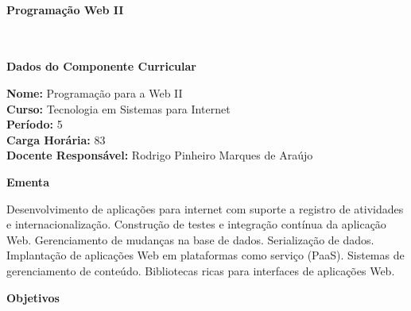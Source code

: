 \paragraph{Programação Web II} \


\begin{snugshade}\begin{center}\textbf{
    Dados do Componente Curricular
}\end{center}\end{snugshade}

\noindent \textbf{Nome:}                Programação para a Web II
\\        \textbf{Curso:}               Tecnologia em Sistemas para Internet
\\        \textbf{Período:}             \unit{5}{\degree}
\\        \textbf{Carga Horária:}       \unit{83}{\hour}
\\        \textbf{Docente Responsável:} Rodrigo Pinheiro Marques de Araújo


\begin{snugshade}\begin{center}\textbf{
    Ementa
\vphantom{q}}\end{center}\end{snugshade}

\noindent
Desenvolvimento de aplicações para internet com suporte a registro de atividades e internacionalização. Construção de testes e integração contínua da aplicação Web. Gerenciamento de mudanças na base de dados. Serialização de dados. Implantação de aplicações Web em plataformas como serviço (PaaS). Sistemas de gerenciamento de conteúdo. Bibliotecas ricas para interfaces de aplicações Web.



\begin{snugshade}\begin{center}\textbf{
    Objetivos
}\end{center}\end{snugshade}

